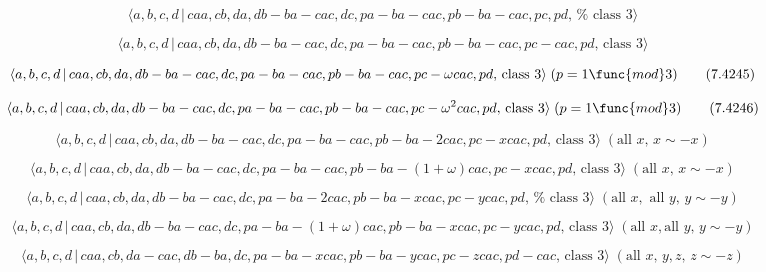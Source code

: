 \documentclass[10pt]{article}
\begin{document}
\begin{equation}
\langle a,b,c,d\,|\,caa,cb,da,db-ba-cac,dc,pa-ba-cac,pb-ba-cac,pc,pd,\,\text{%
class }3\rangle  \tag{7.4243}
\end{equation}

\begin{equation}
\langle a,b,c,d\,|\,caa,cb,da,db-ba-cac,dc,pa-ba-cac,pb-ba-cac,pc-cac,pd,\,%
\text{class }3\rangle  \tag{7.4244}
\end{equation}

\begin{equation}
\langle a,b,c,d\,|\,caa,cb,da,db-ba-cac,dc,pa-ba-cac,pb-ba-cac,pc-\omega
cac,pd,\,\text{class }3\rangle \;(p=1\func{mod}3)  \tag{7.4245}
\end{equation}

\begin{equation}
\langle a,b,c,d\,|\,caa,cb,da,db-ba-cac,dc,pa-ba-cac,pb-ba-cac,pc-\omega
^{2}cac,pd,\,\text{class }3\rangle \;(p=1\func{mod}3)  \tag{7.4246}
\end{equation}

\begin{equation}
\langle a,b,c,d\,|\,caa,cb,da,db-ba-cac,dc,pa-ba-cac,pb-ba-2cac,pc-xcac,pd,\,%
\text{class }3\rangle \;(\text{all }x,\,x\sim -x)  \tag{7.4247}
\end{equation}

\begin{equation}
\langle a,b,c,d\,|\,caa,cb,da,db-ba-cac,dc,pa-ba-cac,pb-ba-(1+\omega
)cac,pc-xcac,pd,\,\text{class }3\rangle \;(\text{all }x,\,x\sim -x) 
\tag{7.4248}
\end{equation}

\begin{equation}
\langle
a,b,c,d\,|\,caa,cb,da,db-ba-cac,dc,pa-ba-2cac,pb-ba-xcac,pc-ycac,pd,\,\text{%
class }3\rangle \;(\text{all }x,\text{ all }y,\,y\sim -y)  \tag{7.4249}
\end{equation}

\begin{equation}
\langle a,b,c,d\,|\,caa,cb,da,db-ba-cac,dc,pa-ba-(1+\omega
)cac,pb-ba-xcac,pc-ycac,pd,\,\text{class }3\rangle \;(\text{all }x,\text{
all }y,\,y\sim -y)  \tag{7.4250}
\end{equation}

\begin{equation}
\langle
a,b,c,d\,|\,caa,cb,da-cac,db-ba,dc,pa-ba-xcac,pb-ba-ycac,pc-zcac,pd-cac,\,%
\text{class }3\rangle \;(\text{all }x,\,y,z,\,z\sim -z)  \tag{7.4251}
\end{equation}
\end{document}
